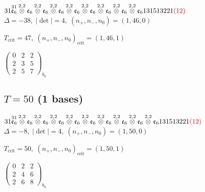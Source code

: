 \documentclass[10pt]{article}
\begin{document}
$31\overset{31}{\mathfrak{e}_6}\overset{2,2}{\otimes}\mathfrak{e}_6\overset{2,2}{\otimes}\mathfrak{e}_6\overset{2,2}{\otimes}\mathfrak{e}_6\overset{2,2}{\otimes}\mathfrak{e}_6\overset{2,2}{\otimes}\mathfrak{e}_6\overset{2,2}{\otimes}\mathfrak{e}_6\overset{2,2}{\otimes}\mathfrak{e}_6\overset{2,2}{\otimes}\mathfrak{e}_6131513221\textcolor{red}{(12)}$ \quad $\Delta=-38,\; |\det|=4,\; (n_+,n_-,n_0)=(1,46,0)$

\hspace{1em}$T_{\text{crit}}=47,\; (n_+,n_-,n_0)_{\text{crit}}=(1,46,1)$

\hspace{2em}$\left(\begin{smallmatrix}0 & 2 & 2 \\ 2 & 3 & 5 \\ 2 & 5 & 7\end{smallmatrix}\right)_{\!b_0}$


\subsection*{$T = 50$ \quad (1 bases)}
\smallskip

$31\overset{31}{\mathfrak{e}_6}\overset{2,2}{\otimes}\mathfrak{e}_6\overset{2,2}{\otimes}\mathfrak{e}_6\overset{2,2}{\otimes}\mathfrak{e}_6\overset{2,2}{\otimes}\mathfrak{e}_6\overset{2,2}{\otimes}\mathfrak{e}_6\overset{2,2}{\otimes}\mathfrak{e}_6\overset{2,2}{\otimes}\mathfrak{e}_6\overset{2,2}{\otimes}\mathfrak{e}_6\overset{2,2}{\otimes}\mathfrak{e}_6131513221\textcolor{red}{(12)}$ \quad $\Delta=-8,\; |\det|=4,\; (n_+,n_-,n_0)=(1,50,0)$

\hspace{1em}$T_{\text{crit}}=50,\; (n_+,n_-,n_0)_{\text{crit}}=(1,50,1)$

\hspace{2em}$\left(\begin{smallmatrix}0 & 2 & 2 \\ 2 & 4 & 6 \\ 2 & 6 & 8\end{smallmatrix}\right)_{\!b_0}$
\end{document}
